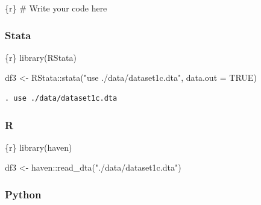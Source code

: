 \documentclass[
  letterpaper,
  DIV=11,
  numbers=noendperiod,
  oneside]{scrreprt}
\newenvironment{Shaded}{\begin{snugshade}}{\end{snugshade}}
\newcommand{\AttributeTok}[1]{\textcolor[rgb]{0.40,0.45,0.13}{#1}}
\newcommand{\CommentTok}[1]{\textcolor[rgb]{0.37,0.37,0.37}{#1}}
\newcommand{\ConstantTok}[1]{\textcolor[rgb]{0.56,0.35,0.01}{#1}}
\newcommand{\FunctionTok}[1]{\textcolor[rgb]{0.28,0.35,0.67}{#1}}
\newcommand{\InformationTok}[1]{\textcolor[rgb]{0.37,0.37,0.37}{#1}}
\newcommand{\NormalTok}[1]{\textcolor[rgb]{0.00,0.23,0.31}{#1}}
\newcommand{\OtherTok}[1]{\textcolor[rgb]{0.00,0.23,0.31}{#1}}
\newcommand{\SpecialCharTok}[1]{\textcolor[rgb]{0.37,0.37,0.37}{#1}}
\newcommand{\StringTok}[1]{\textcolor[rgb]{0.13,0.47,0.30}{#1}}
\begin{document}
\begin{Shaded}
\begin{Highlighting}[]
\InformationTok{\textasciigrave{}\textasciigrave{}\textasciigrave{}\{r\}}
\CommentTok{\# Write your code here}
\InformationTok{\textasciigrave{}\textasciigrave{}\textasciigrave{}}
\end{Highlighting}
\end{Shaded}

\hypertarget{stata-2}{%
\subsubsection{Stata}\label{stata-2}}

\begin{Shaded}
\begin{Highlighting}[]
\InformationTok{\textasciigrave{}\textasciigrave{}\textasciigrave{}\{r\}}
\FunctionTok{library}\NormalTok{(RStata)}

\NormalTok{df3 }\OtherTok{\textless{}{-}}\NormalTok{ RStata}\SpecialCharTok{::}\FunctionTok{stata}\NormalTok{(}\StringTok{"use ./data/dataset1c.dta"}\NormalTok{,}
                     \AttributeTok{data.out =} \ConstantTok{TRUE}\NormalTok{)}
\InformationTok{\textasciigrave{}\textasciigrave{}\textasciigrave{}}
\end{Highlighting}
\end{Shaded}

\begin{verbatim}
. use ./data/dataset1c.dta
\end{verbatim}

\hypertarget{r-2}{%
\subsubsection{R}\label{r-2}}

\begin{Shaded}
\begin{Highlighting}[]
\InformationTok{\textasciigrave{}\textasciigrave{}\textasciigrave{}\{r\}}
\FunctionTok{library}\NormalTok{(haven)}

\NormalTok{df3 }\OtherTok{\textless{}{-}}\NormalTok{ haven}\SpecialCharTok{::}\FunctionTok{read\_dta}\NormalTok{(}\StringTok{"./data/dataset1c.dta"}\NormalTok{)}
\InformationTok{\textasciigrave{}\textasciigrave{}\textasciigrave{}}
\end{Highlighting}
\end{Shaded}

\hypertarget{python-2}{%
\subsubsection{Python}\label{python-2}}
\end{document}
